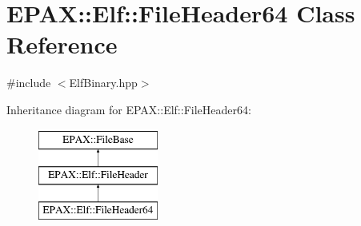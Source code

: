\hypertarget{class_e_p_a_x_1_1_elf_1_1_file_header64}{\section{\-E\-P\-A\-X\-:\-:\-Elf\-:\-:\-File\-Header64 \-Class \-Reference}
\label{class_e_p_a_x_1_1_elf_1_1_file_header64}
}


{\ttfamily \#include $<$\-Elf\-Binary.\-hpp$>$}

\-Inheritance diagram for \-E\-P\-A\-X\-:\-:\-Elf\-:\-:\-File\-Header64\-:\begin{figure}[H]
\begin{center}
\leavevmode
\includegraphics[height=3.000000cm]{class_e_p_a_x_1_1_elf_1_1_file_header64}
\end{center}
\end{figure}
